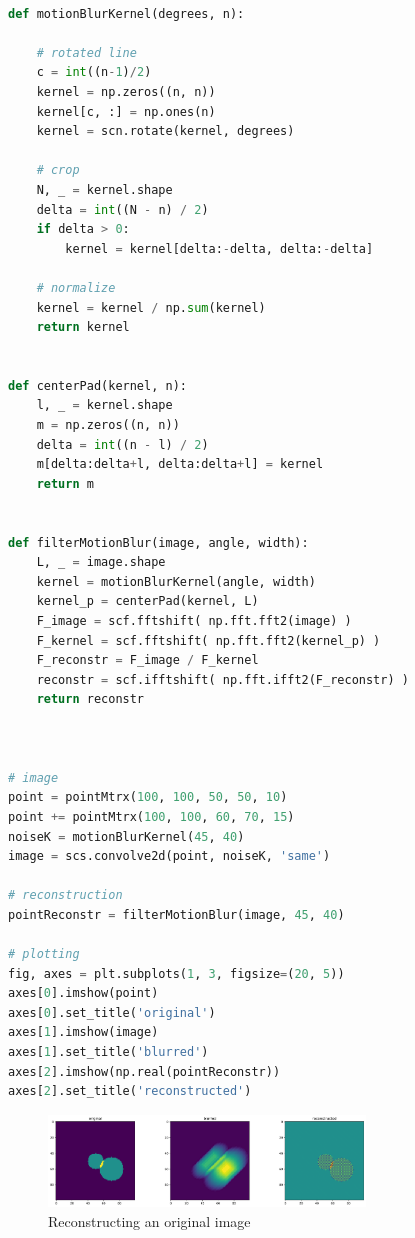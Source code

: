 \begin{lstlisting}[language=python]

def motionBlurKernel(degrees, n):

    # rotated line
    c = int((n-1)/2)
    kernel = np.zeros((n, n))
    kernel[c, :] = np.ones(n)
    kernel = scn.rotate(kernel, degrees)

    # crop
    N, _ = kernel.shape
    delta = int((N - n) / 2)
    if delta > 0:
        kernel = kernel[delta:-delta, delta:-delta]
    
    # normalize
    kernel = kernel / np.sum(kernel)
    return kernel


def centerPad(kernel, n):
    l, _ = kernel.shape
    m = np.zeros((n, n))
    delta = int((n - l) / 2)
    m[delta:delta+l, delta:delta+l] = kernel
    return m


def filterMotionBlur(image, angle, width):
    L, _ = image.shape
    kernel = motionBlurKernel(angle, width)
    kernel_p = centerPad(kernel, L)
    F_image = scf.fftshift( np.fft.fft2(image) )
    F_kernel = scf.fftshift( np.fft.fft2(kernel_p) )
    F_reconstr = F_image / F_kernel
    reconstr = scf.ifftshift( np.fft.ifft2(F_reconstr) )
    return reconstr



# image
point = pointMtrx(100, 100, 50, 50, 10)
point += pointMtrx(100, 100, 60, 70, 15)
noiseK = motionBlurKernel(45, 40)
image = scs.convolve2d(point, noiseK, 'same')

# reconstruction
pointReconstr = filterMotionBlur(image, 45, 40)

# plotting
fig, axes = plt.subplots(1, 3, figsize=(20, 5))
axes[0].imshow(point)
axes[0].set_title('original')
axes[1].imshow(image)
axes[1].set_title('blurred')
axes[2].imshow(np.real(pointReconstr))
axes[2].set_title('reconstructed')
\end{lstlisting}

\begin{figure}[H]
    \caption{Reconstructing an original image}
    \centering
      \includegraphics[width=0.75\textwidth]{images/deconvolution.png}
  \end{figure}